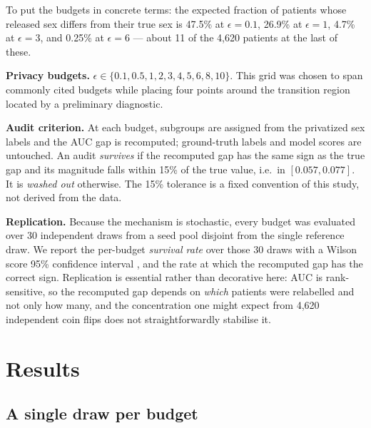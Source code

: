 \documentclass[11pt]{article}
\begin{document}
To put the budgets in concrete terms: the expected fraction of patients whose released sex differs from their true sex is 47.5\% at $\epsilon=0.1$, 26.9\% at $\epsilon=1$, 4.7\% at $\epsilon=3$, and 0.25\% at $\epsilon=6$ --- about 11 of the 4,620 patients at the last of these.

\textbf{Privacy budgets.} $\epsilon \in \{0.1, 0.5, 1, 2, 3, 4, 5, 6, 8, 10\}$. This grid was chosen to span commonly cited budgets while placing four points around the transition region located by a preliminary diagnostic.

\textbf{Audit criterion.} At each budget, subgroups are assigned from the privatized sex labels and the AUC gap is recomputed; ground-truth labels and model scores are untouched. An audit \emph{survives} if the recomputed gap has the same sign as the true gap and its magnitude falls within 15\% of the true value, i.e.\ in $[0.057, 0.077]$. It is \emph{washed out} otherwise. The 15\% tolerance is a fixed convention of this study, not derived from the data.

\textbf{Replication.} Because the mechanism is stochastic, every budget was evaluated over 30 independent draws from a seed pool disjoint from the single reference draw. We report the per-budget \emph{survival rate} over those 30 draws with a Wilson score 95\% confidence interval \cite{wilson1927}, and the rate at which the recomputed gap has the correct sign. Replication is essential rather than decorative here: AUC is rank-sensitive, so the recomputed gap depends on \emph{which} patients were relabelled and not only how many, and the concentration one might expect from 4,620 independent coin flips does not straightforwardly stabilise it.

\section{Results}

\subsection{A single draw per budget}
\end{document}

